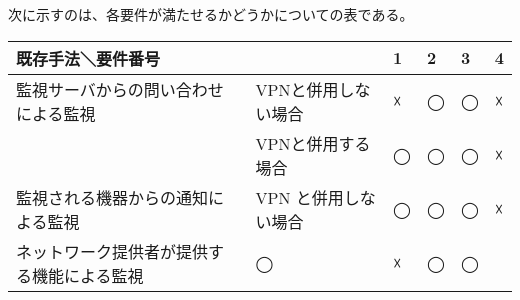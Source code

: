 	次に示すのは、各要件が満たせるかどうかについての表である。
	\begin{table}[htb]
	\begin{tabular}{|l|l|l|l|l|l|} \hline
		\multicolumn{2}{|l|}{既存手法＼要件番号} & 
		\multicolumn{1}{|l|}{1} &
		\multicolumn{1}{|l|}{2} &
		\multicolumn{1}{|l|}{3} &
		\multicolumn{1}{|l|}{4} \\ \hline \hline
		監視サーバからの問い合わせによる監視 & VPNと併用しない場合 & ☓ & ◯ & ◯ & ☓  \\ \cline{2-4}
			& VPNと併用する場合 & ◯ & ◯ & ◯ & ☓ \\ \hline
		監視される機器からの通知による監視 & VPN と併用しない場合 & ◯ & ◯ & ◯ & ☓ \\ \hline
		ネットワーク提供者が提供する機能による監視 & ◯ & ☓ & ◯ & ◯ \\ \hline
	\end{tabular}
	\end{table}
\begin{comment}
	しかし、サーバーからの問い合わせによる監視では、IoT機器が接続するネットワークがプライベートアドレスであった場合に利用できず、
	監視対象機器からの通知による監視では、新たに機器監視サーバをたち上げなくてはならない。
	また、ネットワークの提供者による機器の監視サービスでは、提供ネットワークを利用した機器のリンクアップ・ダウンしか監視することが出来ず、
	VPNを利用した方法では、IoT機器が接続するネットワークのアドレス帯が多様であることから、難しい。
\end{comment}
	
	







